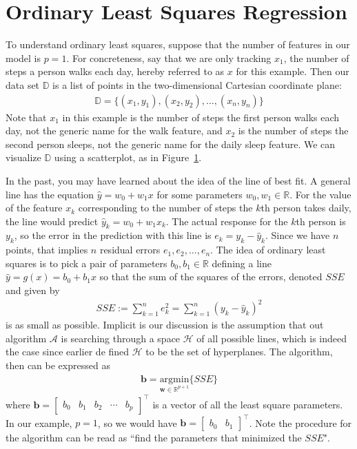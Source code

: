 \documentclass[12pt]{article}
\begin{document}
	\section{Ordinary Least Squares Regression}
	To understand ordinary least squares, suppose that the number of features
	in our model is $p=1$. For concreteness, say that we are only tracking
	$x_1$, the number of steps a person walks each day, hereby referred to
	as $x$ for this example. Then our data set $\mathbb{D}$ is a list of points
	in the two-dimensional Cartesian coordinate plane:
	\begin{align*}
		\mathbb{D} = \{
		(x_1,y_1), (x_2,y_2),\ldots,(x_n,y_n)
		\}
	\end{align*}
	Note that $x_1$ in this example is the number of steps the first person walks each day,
	not the generic name for the walk feature, and $x_2$ is the number of steps
	the second person sleeps, not the generic name for the daily sleep feature.
	We can visualize $\mathbb{D}$ using a scatterplot, as in Figure~\ref{fig:example-dataset-1-feature}.
	\begin{figure}
		\centering
		\label{fig:example-dataset-1-feature}
	\end{figure}
	In the past, you may have learned about the idea of the line of best fit.
	A general line has the equation $\hat{y} = w_0 + w_1x$ for some parameters
	$w_0,w_1\in\mathbb{R}$. For the value of the feature $x_k$ corresponding
	to the number of steps the $k$th person takes daily, the line would predict
	$\hat{y}_k = w_0+w_1x_k$. The actual response for the $k$th person is
	$y_k$, so the error in the prediction with this line is $e_k = y_k-\hat{y}_k$.
	Since we have $n$ points, that implies $n$ residual errors $e_1,e_2,\ldots,e_n$.
	The idea of ordinary least squares is to pick a pair of parameters
	$b_0,b_1\in \mathbb{R}$ defining a line $\hat{y}=g(x)=b_0+b_1x$ so that
	the sum of the squares of the errors, denoted $SSE$ and given by
	\begin{align*}
		SSE := \sum_{k=1}^{n}e_k^2 = \sum_{k=1}^{n}(y_k-\hat{y}_k)^2
	\end{align*}
	 is as small as possible. Implicit is our discussion is the assumption that
	 out algorithm $\mathcal{A}$ is searching through a space $\mathcal{H}$ of all
	 possible lines, which is indeed the case since earlier de fined
	 $\mathcal{H}$ to be the set of hyperplanes. The algorithm, then
	 can be expressed as
	 \begin{align*}
	 	\bm{b} = \underset{\bm{w}\in \mathbb{R}^{p+1}}{\text{argmin}}\{SSE\}
	 \end{align*}
	 where $\bm{b}=\begin{bmatrix}
	 	b_0 & b_1 & b_2 & \cdots & b_p
	 \end{bmatrix}^\top$ is a vector of all the least square parameters.
	 In our example, $p=1$, so we would have $\bm{b}=\begin{bmatrix}
	 	b_0 & b_1
	 \end{bmatrix}^\top$. Note the procedure for the algorithm can be
	 read as ``find the parameters that minimized the $SSE$".
	 
\end{document}
